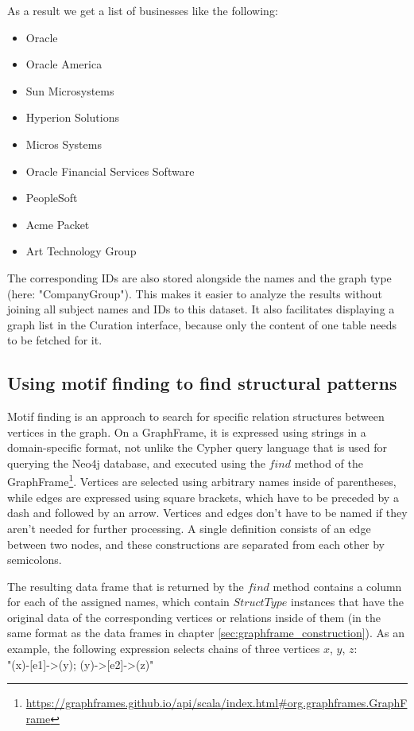 \documentclass[
        a4paper,     %
        titlepage,   %
        oneside,     %
        parskip      %
]{scrartcl}          %
\begin{document}
  As a result we get a list of businesses like the following:
  \begin{itemize}[noitemsep]
  \item Oracle
  \item Oracle America
  \item Sun Microsystems
  \item Hyperion Solutions
  \item Micros Systems
  \item Oracle Financial Services Software
  \item PeopleSoft
  \item Acme Packet
  \item Art Technology Group
  \end{itemize}

  The corresponding IDs are also stored alongside the names and the graph type (here: "CompanyGroup"). This makes it easier to analyze
  the results without joining all subject names and IDs to this dataset. It also facilitates displaying
  a graph list in the Curation interface, because only the content of one table needs to be fetched for it.

  \subsection{Using motif finding to find structural patterns}
  Motif finding is an approach to search for specific relation structures between
  vertices in the graph. On a GraphFrame, it is expressed using strings in a
  domain-specific format, not unlike the Cypher query language that is used for
  querying the Neo4j database, and executed using the $find$ method of the
  GraphFrame\footnote{\url{https://graphframes.github.io/api/scala/index.html\#org.graphframes.GraphFrame}}.
  Vertices are selected using arbitrary names inside of parentheses, while edges are
  expressed using square brackets, which have to be preceded by a dash and followed by
  an arrow. Vertices and edges don't have to be named if they aren't needed for further processing.
  A single definition consists of an edge between two nodes, and these constructions are
  separated from each other by semicolons.

  The resulting data frame that is returned by the $find$ method contains a column
  for each of the assigned names, which contain $StructType$ instances that have the original
  data of the corresponding vertices or relations inside of them
  (in the same format as the data frames in chapter \ref{sec:graphframe_construction}).
  As an example, the following expression selects chains of three vertices $x$, $y$, $z$:\\
  {\small\ttfamily "(x)-[e1]->(y); (y)->[e2]->(z)"}
\end{document}
